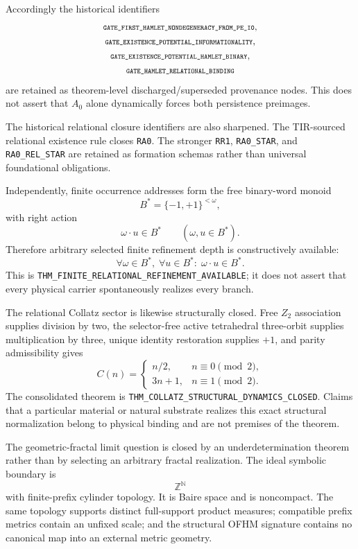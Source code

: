 \documentclass[11pt]{article}
\newcommand{\claimid}[1]{\nolinkurl{#1}}
\newcommand{\claimidmath}[1]{\mbox{\scriptsize\ttfamily\detokenize{#1}}}
\begin{document}
Accordingly the historical identifiers
\[
\begin{gathered}
\claimidmath{GATE_FIRST_HAMLET_NONDEGENERACY_FROM_PE_I0},\\
\claimidmath{GATE_EXISTENCE_POTENTIAL_INFORMATIONALITY},\\
\claimidmath{GATE_EXISTENCE_POTENTIAL_HAMLET_BINARY},\\
\claimidmath{GATE_HAMLET_RELATIONAL_BINDING}
\end{gathered}
\]
are retained as theorem-level discharged/superseded provenance nodes. This
does not assert that \(A_0\) alone dynamically forces both persistence
preimages.

The historical relational closure identifiers are also sharpened. The
TIR-sourced relational existence rule closes \claimid{RA0}. The stronger
\claimid{RR1}, \claimid{RA0_STAR}, and \claimid{RA0_REL_STAR} are retained as
formation schemas rather than universal foundational obligations.

Independently, finite occurrence addresses form the free binary-word monoid
\[
B^*=\{-1,+1\}^{<\omega},
\]
with right action
\[
\omega\cdot u\in B^*
\qquad
(\omega,u\in B^*).
\]
Therefore arbitrary selected finite refinement depth is constructively
available:
\[
\boxed{
\forall \omega\in B^*,\;
\forall u\in B^*:\;
\omega\cdot u\in B^*.
}
\]
This is
\claimid{THM_FINITE_RELATIONAL_REFINEMENT_AVAILABLE}; it does not assert that
every physical carrier spontaneously realizes every branch.

The relational Collatz sector is likewise structurally closed. Free \(Z_2\)
association supplies division by two, the selector-free active tetrahedral
three-orbit supplies multiplication by three, unique identity restoration
supplies \(+1\), and parity admissibility gives
\[
\boxed{
C(n)
=
\begin{cases}
n/2,& n\equiv0\pmod2,\\
3n+1,& n\equiv1\pmod2.
\end{cases}
}
\]
The consolidated theorem is
\claimid{THM_COLLATZ_STRUCTURAL_DYNAMICS_CLOSED}. Claims that a particular
material or natural substrate realizes this exact structural normalization
belong to physical binding and are not premises of the theorem.

The geometric-fractal limit question is closed by an
underdetermination theorem rather than by selecting an arbitrary fractal
realization. The ideal symbolic boundary is
\[
\boxed{\mathbb Z^{\mathbb N}}
\]
with finite-prefix cylinder topology. It is Baire space and is noncompact.
The same topology supports distinct full-support product measures; compatible
prefix metrics contain an unfixed scale; and the structural OFHM signature
contains no canonical map into an external metric geometry.
\end{document}
